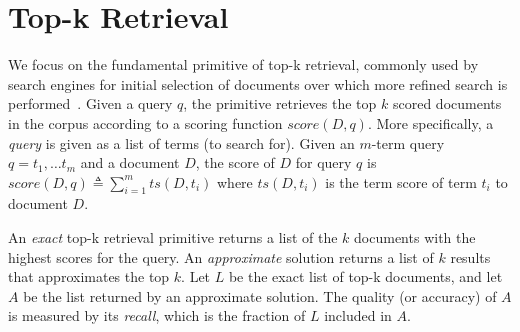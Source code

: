 

\section{Top-k Retrieval}
\label{sec:problem}

We focus on the fundamental primitive of top-k retrieval, commonly used by search engines for initial selection of documents over which more refined search is performed~\cite{Wang:2011}. 
Given a query $q$, the primitive retrieves the top $k$ scored documents in the corpus according to a scoring function $\textit{score}(D, q)$.  
%
More specifically, a \emph{query} is given as a list of terms (to search for). Given an $m$-term query $q = t_1, \dots t_m$ and a document $D$, the score of $D$ for query $q$ is 
$\textit{score}(D, q) \triangleq \sum_{i=1}^m ts(D, t_i)$ 
where $ts(D, t_i)$ is the term score of term $t_i$ to document $D$. 

An \emph{exact} top-k retrieval primitive returns a list of the $k$ documents with the highest scores for the query.
An \emph{approximate} solution returns a list of $k$ results that approximates the top $k$. 
Let $L$ be the exact list of top-k documents,  
and let $A$ be the list returned by an approximate solution. 
The quality (or accuracy) of  $A$ is measured by its
\emph{recall}, which is  the fraction of $L$ included in $A$.


